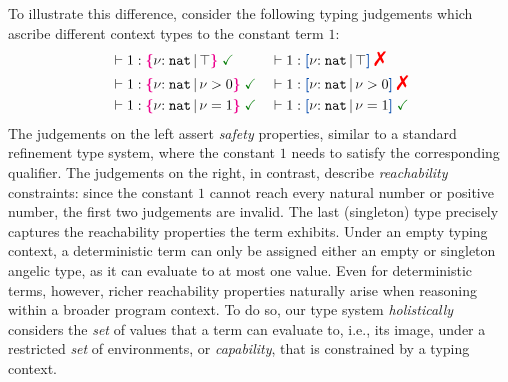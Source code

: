 
To illustrate this difference, consider the following typing
judgements which ascribe different context types to the constant term
$1$:
\vspace{-0.2em}
\begin{align*}
  &\vdash 1 : \ort{\Nat}{\top}\;\judgok
  && \vdash 1 : \urt{\Nat}{\top}\;\judgfail
  \\&\vdash 1 : \ort{\Nat}{\vnu > 0}\;\judgok
  && \vdash 1 : \urt{\Nat}{\vnu > 0}\;\judgfail
  \\&\vdash 1 : \ort{\Nat}{\vnu = 1}\;\judgok
  && \vdash 1 : \urt{\Nat}{\vnu = 1}\;\judgok
\end{align*}\noindent
The judgements on the left assert \emph{safety} properties, similar to
a standard refinement type system, where the constant $1$ needs to
satisfy the corresponding qualifier. The judgements on the right, in
contrast, describe \emph{reachability} constraints: since the constant
$1$ cannot reach every natural number or positive number, the first
two judgements are invalid. The last (singleton) type precisely
captures the reachability properties the term exhibits. Under an empty
typing context, a deterministic term %
can only be assigned either an empty or singleton angelic type, as it
can evaluate to at most one value.  Even for deterministic terms,
however, richer reachability properties naturally arise when reasoning
within a broader program context. To do so, our type system
\emph{holistically} considers the \emph{set} of values that a term can
evaluate to, i.e., its image, under a restricted \emph{set} of
environments, or \emph{capability}, that is constrained by a typing
context.


